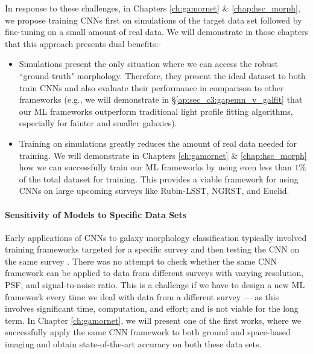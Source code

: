 In response to these challenges, in Chapters \ref{ch:gamornet} \& \ref{chap:hsc_morph}, we propose training CNNs first on simulations of the target data set followed by fine-tuning on a small amount of real data. We will demonstrate in those chapters that this approach presents dual benefits:- 
\begin{itemize}
    \item Simulations present the only situation where we can access the robust ``ground-truth" morphology. Therefore, they present the ideal dataset to both train CNNs and also evaluate their performance in comparison to other frameworks (e.g., we will demonstrate in \S \ref{ap:sec_c3:gapemn_v_galfit} that our ML frameworks outperform traditional light profile fitting algorithms, especially for fainter and smaller galaxies).
    \item Training on simulations greatly reduces the amount of real data needed for training. We will demonstrate in Chapters \ref{ch:gamornet} \& \ref{chap:hsc_morph} how we can successfully train our ML frameworks by using even less than $1\%$ of the total dataset for training. This provides a viable framework for using CNNs on large upcoming surveys like Rubin-LSST, NGRST, and Euclid.
\end{itemize}


\paragraph{Sensitivity of Models to Specific Data Sets} Early applications of CNNs to galaxy morphology classification typically involved training frameworks  targeted for a specific survey and then testing the CNN on the same survey \citep[e.g.,][]{Dieleman2015Rotation-invariantPrediction, Huertas-Company2015ALEARNING, Tuccillo2018DeepFitting}. There was no attempt to check whether the same CNN framework can be applied to data from different surveys with varying resolution, PSF, and signal-to-noise ratio. This is a challenge if we have to design a new ML framework every time we deal with data from a different survey --- as this involves significant time, computation, and effort; and is not viable for the long term. In Chapter \ref{ch:gamornet}, we will present one of the first works, where we successfully apply the same CNN framework to both ground and space-based imaging and obtain state-of-the-art accuracy on both these data sets. 

